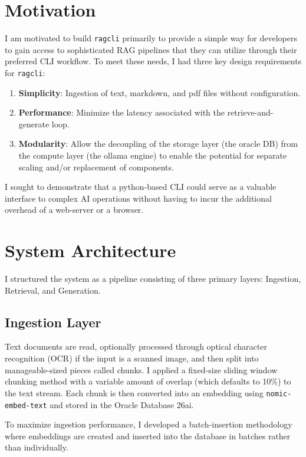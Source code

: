 \documentclass[11pt,a4paper]{article}
\begin{document}
\section{Motivation}

I am motivated to build \texttt{ragcli} primarily to provide a simple way for developers to gain access to sophisticated RAG pipelines that they can utilize through their preferred CLI workflow. To meet these needs, I had three key design requirements for \texttt{ragcli}:
\begin{enumerate}
\item \textbf{Simplicity}: Ingestion of text, markdown, and pdf files without configuration.
\item \textbf{Performance}: Minimize the latency associated with the retrieve-and-generate loop.
\item \textbf{Modularity}: Allow the decoupling of the storage layer (the oracle DB) from the compute layer (the ollama engine) to enable the potential for separate scaling and/or replacement of components.
\end{enumerate}

I sought to demonstrate that a python-based CLI could serve as a valuable interface to complex AI operations without having to incur the additional overhead of a web-server or a browser.

\section{System Architecture}

I structured the system as a pipeline consisting of three primary layers: Ingestion, Retrieval, and Generation.

\subsection{Ingestion Layer}

Text documents are read, optionally processed through optical character recognition (OCR) if the input is a scanned image, and then split into manageable-sized pieces called chunks. I applied a fixed-size sliding window chunking method with a variable amount of overlap (which defaults to 10\%) to the text stream. Each chunk is then converted into an embedding using \texttt{nomic-embed-text} and stored in the Oracle Database 26ai.

To maximize ingestion performance, I developed a batch-insertion methodology where embeddings are created and inserted into the database in batches rather than individually.
\end{document}
